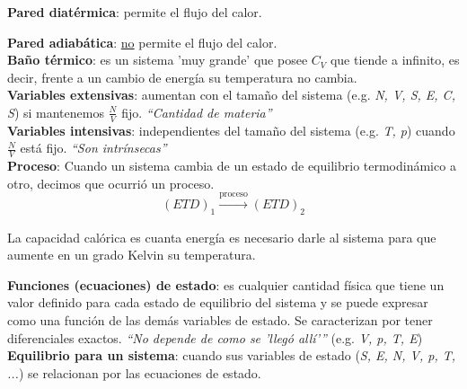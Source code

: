 \textbf{Pared diatérmica}: permite el flujo del calor.


\textbf{Pared adiabática}: \underline{no} permite el flujo del calor.
\\

\textbf{Baño térmico}: es un sistema 'muy grande' que posee $C_V$ que tiende a infinito, es decir, frente a un cambio de energía su temperatura no cambia.
\\

\textbf{Variables extensivas}: aumentan con el tamaño del sistema (e.g. \textit{N, V, S, E, C, S}) si mantenemos $\frac{N}{V}$ fijo. \textit{\enquote{Cantidad de materia}}
\\

\textbf{Variables intensivas}: independientes del tamaño del sistema (e.g. \textit{T, p}) cuando $\frac{N}{V}$ está fijo. \textit{\enquote{Son intrínsecas}}
\\

\textbf{Proceso}: Cuando un sistema cambia de un estado de equilibrio termodinámico a otro, decimos que ocurrió un proceso.
\[(ETD)_1 \xrightarrow[]{\text{proceso}} (ETD)_2 \]




La capacidad calórica es cuanta energía es necesario darle al sistema para que aumente en un grado Kelvin su temperatura.


\textbf{Funciones (ecuaciones) de estado}: es cualquier cantidad física que tiene un valor definido para cada estado de equilibrio del sistema y se puede expresar como una función de las demás variables de estado. Se caracterizan por tener diferenciales exactos. \textit{\enquote{No depende de como se 'llegó allí'}} \quad (e.g. \textit{V, p, T, E})
\\

\textbf{Equilibrio para un sistema}: cuando sus variables de estado (\textit{S, E, N, V, p, T, ...}) se relacionan por las ecuaciones de estado.


